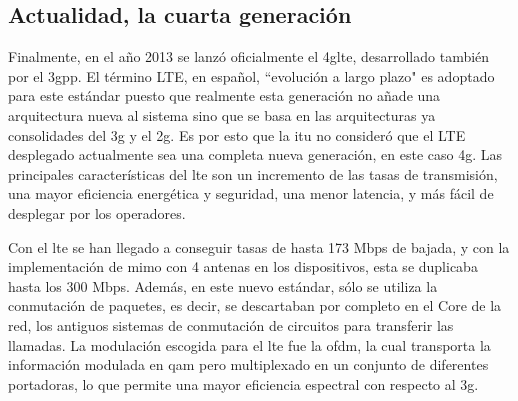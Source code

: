 \subsection{Actualidad, la cuarta generación}
\par Finalmente, en el año 2013 se lanzó oficialmente el \gls{4glte}, desarrollado también por el \gls{3gpp}. El término LTE, en español, ``evolución a largo plazo" es adoptado para este estándar puesto que realmente esta generación no añade una arquitectura nueva al sistema sino que se basa en las arquitecturas ya consolidades del \gls {3g} y el \gls{2g}. Es por esto que la \gls{itu} no consideró que el LTE desplegado actualmente sea una completa nueva generación, en este caso \gls{4g}. Las principales características del \gls{lte} son un incremento de las tasas de transmisión, una mayor eficiencia energética y seguridad, una menor latencia, y más fácil de desplegar por los operadores. \cite{LaCuevaGSM2014, Zavias2012}
\\
\par Con el \gls{lte} se han llegado a conseguir tasas de hasta 173 Mbps de bajada, y con la implementación de \gls{mimo} con 4 antenas en los dispositivos, esta se duplicaba hasta los 300 Mbps. Además, en este nuevo estándar, sólo se utiliza la conmutación de paquetes, es decir, se descartaban por completo en el Core de la red, los antiguos sistemas de conmutación de circuitos para transferir las llamadas. La modulación escogida para el \gls{lte} fue la \gls{ofdm}, la cual transporta la información modulada en \gls{qam} pero multiplexado en un conjunto de diferentes portadoras, lo que permite una mayor eficiencia espectral con respecto al \gls{3g}.

